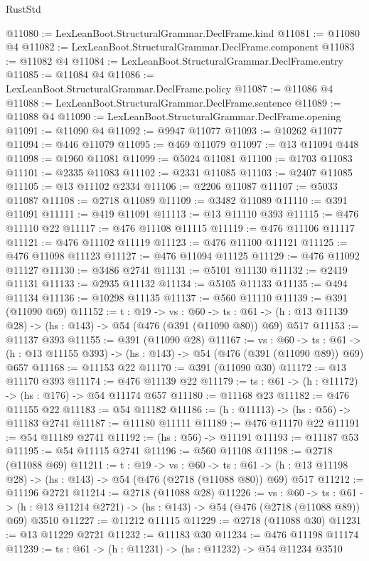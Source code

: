 \begin{lexlean}{RustStd}
\begin{coremodule}
@11080 := LexLeanBoot.StructuralGrammar.DeclFrame.kind
@11081 := @11080 @4
@11082 := LexLeanBoot.StructuralGrammar.DeclFrame.component
@11083 := @11082 @4
@11084 := LexLeanBoot.StructuralGrammar.DeclFrame.entry
@11085 := @11084 @4
@11086 := LexLeanBoot.StructuralGrammar.DeclFrame.policy
@11087 := @11086 @4
@11088 := LexLeanBoot.StructuralGrammar.DeclFrame.sentence
@11089 := @11088 @4
@11090 := LexLeanBoot.StructuralGrammar.DeclFrame.opening
@11091 := @11090 @4
@11092 := @9947 @11077
@11093 := @10262 @11077
@11094 := @446 @11079
@11095 := @469 @11079
@11097 := @13 @11094 @448
@11098 := @1960 @11081
@11099 := @5024 @11081
@11100 := @1703 @11083
@11101 := @2335 @11083
@11102 := @2331 @11085
@11103 := @2407 @11085
@11105 := @13 @11102 @2334
@11106 := @2206 @11087
@11107 := @5033 @11087
@11108 := @2718 @11089
@11109 := @3482 @11089
@11110 := @391 @11091
@11111 := @419 @11091
@11113 := @13 @11110 @393
@11115 := @476 @11110 @22
@11117 := @476 @11108 @11115
@11119 := @476 @11106 @11117
@11121 := @476 @11102 @11119
@11123 := @476 @11100 @11121
@11125 := @476 @11098 @11123
@11127 := @476 @11094 @11125
@11129 := @476 @11092 @11127
@11130 := @3486 @2741
@11131 := @5101 @11130
@11132 := @2419 @11131
@11133 := @2935 @11132
@11134 := @5105 @11133
@11135 := @494 @11134
@11136 := @10298 @11135
@11137 := @560 @11110
@11139 := @391 (@11090 @69)
@11152 := {t : @19} ->
  {vs : @60} ->
  {ts : @61} -> (h : @13 @11139 @28) -> (hs : @143) -> @54 (@476 (@391 (@11090 @80)) @69) @517
@11153 := @11137 @393
@11155 := @391 (@11090 @28)
@11167 := {vs : @60} ->
  {ts : @61} -> (h : @13 @11155 @393) -> (hs : @143) -> @54 (@476 (@391 (@11090 @89)) @69) @657
@11168 := @11153 @22
@11170 := @391 (@11090 @30)
@11172 := @13 @11170 @393
@11174 := @476 @11139 @22
@11179 := {ts : @61} -> (h : @11172) -> (hs : @176) -> @54 @11174 @657
@11180 := @11168 @23
@11182 := @476 @11155 @22
@11183 := @54 @11182
@11186 := (h : @11113) -> (hs : @56) -> @11183 @2741
@11187 := @11180 @11111
@11189 := @476 @11170 @22
@11191 := @54 @11189 @2741
@11192 := (hs : @56) -> @11191
@11193 := @11187 @53
@11195 := @54 @11115 @2741
@11196 := @560 @11108
@11198 := @2718 (@11088 @69)
@11211 := {t : @19} ->
  {vs : @60} ->
  {ts : @61} -> (h : @13 @11198 @28) -> (hs : @143) -> @54 (@476 (@2718 (@11088 @80)) @69) @517
@11212 := @11196 @2721
@11214 := @2718 (@11088 @28)
@11226 := {vs : @60} ->
  {ts : @61} -> (h : @13 @11214 @2721) -> (hs : @143) -> @54 (@476 (@2718 (@11088 @89)) @69) @3510
@11227 := @11212 @11115
@11229 := @2718 (@11088 @30)
@11231 := @13 @11229 @2721
@11232 := @11183 @30
@11234 := @476 @11198 @11174
@11239 := {ts : @61} -> (h : @11231) -> (hs : @11232) -> @54 @11234 @3510

\end{coremodule}
\end{lexlean}
